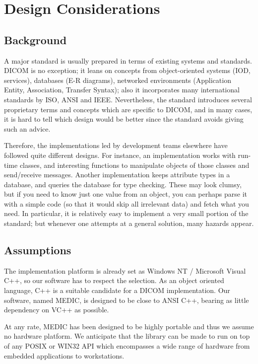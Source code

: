 \documentclass[a4paper,10pt]{article}
\begin{document}
\section{Design Considerations}

\subsection{Background}

A major standard is usually prepared in terms of existing systems and
standards. DICOM is no exception; it leans on concepts from object-oriented
systems (IOD, services), databases (E-R diagrams), networked environments
(Application Entity, Association, Transfer Syntax); also it incorporates
many international standards by ISO, ANSI and IEEE. Nevertheless, the
standard introduces several proprietary terms and concepts which are
specific to DICOM, and in many cases, it is hard to tell which design would
be better since the standard avoids giving such an advice.

Therefore, the implementations led by development teams elsewhere have
followed quite different designs. For instance, an implementation works with
run-time classes, and interesting functions to manipulate objects of those
classes and send/receive messages. Another implementation keeps attribute
types in a database, and queries the database for type checking. These may
look clumsy, but if you need to know just one value from an object, you can
perhaps parse it with a simple code (so that it would skip all irrelevant
data) and fetch what you need. In particular, it is relatively easy to
implement a very small portion of the standard; but whenever one attempts at
a general solution, many hazards appear.

\subsection{Assumptions}

The implementation platform is already set as Windows NT / Microsoft Visual
C++, so our software has to respect the selection. As an object oriented
language, C++ is a suitable candidate for a DICOM implementation. Our
software, named MEDIC, is designed to be close to
ANSI C++, bearing as little dependency on VC++ as possible.

At any rate, MEDIC has been designed to be highly portable and thus
we assume no hardware platform. We anticipate that the library can
be made to run on top of any POSIX or WIN32 API which encompasses
a wide range of hardware from embedded applications to workstations.
\end{document}
